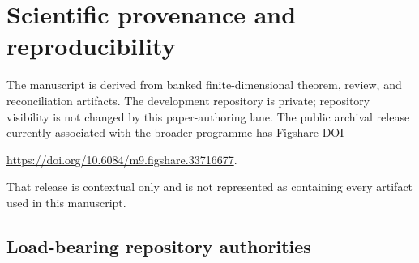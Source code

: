 \section{Scientific provenance and reproducibility}
\label{app:provenance}

The manuscript is derived from banked finite-dimensional theorem, review, and reconciliation artifacts.  The development repository is private; repository visibility is not changed by this paper-authoring lane.  The public archival release currently associated with the broader programme has Figshare DOI
\begin{center}
  \url{https://doi.org/10.6084/m9.figshare.33716677}.
\end{center}
That release is contextual only and is not represented as containing every artifact used in this manuscript.

\subsection{Load-bearing repository authorities}

